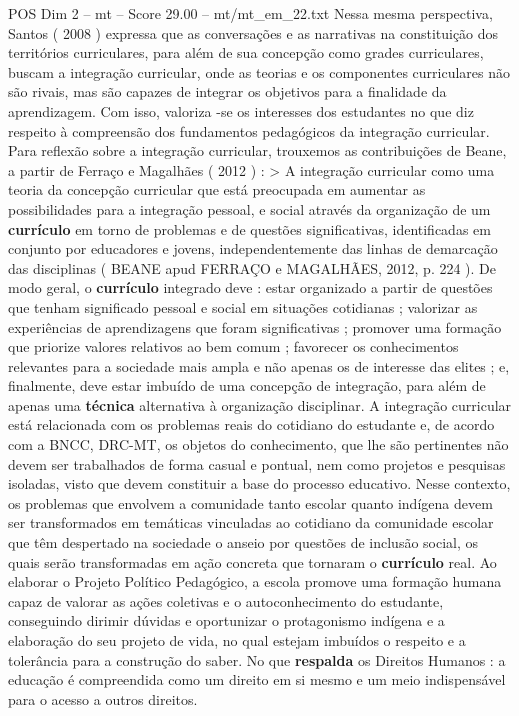 \begin{textsample}{POS Dim 2 – mt – Score 29.00 – mt/mt\_em\_22.txt}
Nessa mesma perspectiva, Santos ( 2008 ) expressa que as conversações e as narrativas na constituição dos territórios curriculares, para além de sua concepção como grades curriculares, buscam a integração curricular, onde as teorias e os componentes curriculares não são rivais, mas são capazes de integrar os objetivos para a finalidade da aprendizagem.
Com isso, valoriza -se os interesses dos estudantes no que diz respeito à compreensão dos fundamentos pedagógicos da integração curricular.
Para reflexão sobre a integração curricular, trouxemos as contribuições de Beane, a partir de Ferraço e Magalhães ( 2012 ) : > A integração curricular como uma teoria da concepção curricular que está preocupada em aumentar as possibilidades para a integração pessoal, e social através da organização de um \textbf{currículo} em torno de problemas e de questões significativas, identificadas em conjunto por educadores e jovens, independentemente das linhas de demarcação das disciplinas ( BEANE apud FERRAÇO e MAGALHÃES, 2012, p. 224 ).
De modo geral, o \textbf{currículo} integrado deve : estar organizado a partir de questões que tenham significado pessoal e social em situações cotidianas ; valorizar as experiências de aprendizagens que foram significativas ; promover uma formação que priorize valores relativos ao bem comum ; favorecer os conhecimentos relevantes para a sociedade mais ampla e não apenas os de interesse das elites ; e, finalmente, deve estar imbuído de uma concepção de integração, para além de apenas uma \textbf{técnica} alternativa à organização disciplinar.
A integração curricular está relacionada com os problemas reais do cotidiano do estudante e, de acordo com a BNCC, DRC-MT, os objetos do conhecimento, que lhe são pertinentes não devem ser trabalhados de forma casual e pontual, nem como projetos e pesquisas isoladas, visto que devem constituir a base do processo educativo.
Nesse contexto, os problemas que envolvem a comunidade tanto escolar quanto indígena devem ser transformados em temáticas vinculadas ao cotidiano da comunidade escolar que têm despertado na sociedade o anseio por questões de inclusão social, os quais serão transformadas em ação concreta que tornaram o \textbf{currículo} real.
Ao elaborar o Projeto Político Pedagógico, a escola promove uma formação humana capaz de valorar as ações coletivas e o autoconhecimento do estudante, conseguindo dirimir dúvidas e oportunizar o protagonismo indígena e a elaboração do seu projeto de vida, no qual estejam imbuídos o respeito e a tolerância para a construção do saber.
No que \textbf{respalda} os Direitos Humanos : a educação é compreendida como um direito em si mesmo e um meio indispensável para o acesso a outros direitos.

\end{textsample}
